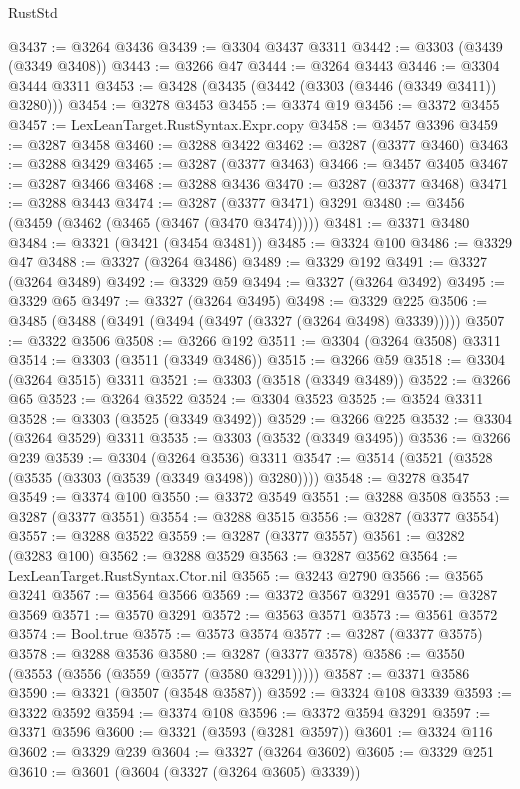 \begin{lexlean}{RustStd}
\begin{coremodule}
{\begin{coremodule}
{{{{{{{{{{{{{{{{{{{{{{{{{{{{{{{{{@3437 := @3264 @3436
@3439 := @3304 @3437 @3311
@3442 := @3303 (@3439 (@3349 @3408))
@3443 := @3266 @47
@3444 := @3264 @3443
@3446 := @3304 @3444 @3311
@3453 := @3428 (@3435 (@3442 (@3303 (@3446 (@3349 @3411)) @3280)))
@3454 := @3278 @3453
@3455 := @3374 @19
@3456 := @3372 @3455
@3457 := LexLeanTarget.RustSyntax.Expr.copy
@3458 := @3457 @3396
@3459 := @3287 @3458
@3460 := @3288 @3422
@3462 := @3287 (@3377 @3460)
@3463 := @3288 @3429
@3465 := @3287 (@3377 @3463)
@3466 := @3457 @3405
@3467 := @3287 @3466
@3468 := @3288 @3436
@3470 := @3287 (@3377 @3468)
@3471 := @3288 @3443
@3474 := @3287 (@3377 @3471) @3291
@3480 := @3456 (@3459 (@3462 (@3465 (@3467 (@3470 @3474)))))
@3481 := @3371 @3480
@3484 := @3321 (@3421 (@3454 @3481))
@3485 := @3324 @100
@3486 := @3329 @47
@3488 := @3327 (@3264 @3486)
@3489 := @3329 @192
@3491 := @3327 (@3264 @3489)
@3492 := @3329 @59
@3494 := @3327 (@3264 @3492)
@3495 := @3329 @65
@3497 := @3327 (@3264 @3495)
@3498 := @3329 @225
@3506 := @3485 (@3488 (@3491 (@3494 (@3497 (@3327 (@3264 @3498) @3339)))))
@3507 := @3322 @3506
@3508 := @3266 @192
@3511 := @3304 (@3264 @3508) @3311
@3514 := @3303 (@3511 (@3349 @3486))
@3515 := @3266 @59
@3518 := @3304 (@3264 @3515) @3311
@3521 := @3303 (@3518 (@3349 @3489))
@3522 := @3266 @65
@3523 := @3264 @3522
@3524 := @3304 @3523
@3525 := @3524 @3311
@3528 := @3303 (@3525 (@3349 @3492))
@3529 := @3266 @225
@3532 := @3304 (@3264 @3529) @3311
@3535 := @3303 (@3532 (@3349 @3495))
@3536 := @3266 @239
@3539 := @3304 (@3264 @3536) @3311
@3547 := @3514 (@3521 (@3528 (@3535 (@3303 (@3539 (@3349 @3498)) @3280))))
@3548 := @3278 @3547
@3549 := @3374 @100
@3550 := @3372 @3549
@3551 := @3288 @3508
@3553 := @3287 (@3377 @3551)
@3554 := @3288 @3515
@3556 := @3287 (@3377 @3554)
@3557 := @3288 @3522
@3559 := @3287 (@3377 @3557)
@3561 := @3282 (@3283 @100)
@3562 := @3288 @3529
@3563 := @3287 @3562
@3564 := LexLeanTarget.RustSyntax.Ctor.nil
@3565 := @3243 @2790
@3566 := @3565 @3241
@3567 := @3564 @3566
@3569 := @3372 @3567 @3291
@3570 := @3287 @3569
@3571 := @3570 @3291
@3572 := @3563 @3571
@3573 := @3561 @3572
@3574 := Bool.true
@3575 := @3573 @3574
@3577 := @3287 (@3377 @3575)
@3578 := @3288 @3536
@3580 := @3287 (@3377 @3578)
@3586 := @3550 (@3553 (@3556 (@3559 (@3577 (@3580 @3291)))))
@3587 := @3371 @3586
@3590 := @3321 (@3507 (@3548 @3587))
@3592 := @3324 @108 @3339
@3593 := @3322 @3592
@3594 := @3374 @108
@3596 := @3372 @3594 @3291
@3597 := @3371 @3596
@3600 := @3321 (@3593 (@3281 @3597))
@3601 := @3324 @116
@3602 := @3329 @239
@3604 := @3327 (@3264 @3602)
@3605 := @3329 @251
@3610 := @3601 (@3604 (@3327 (@3264 @3605) @3339))
}}}}}}}}}}}}}}}}}}}}}}}}}}}}}}}}}
\end{coremodule}}
\end{coremodule}
\end{lexlean}
